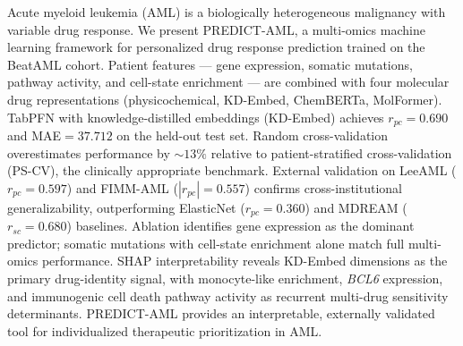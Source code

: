\documentclass[pdflatex,sn-mathphys-num]{sn-jnl}
\theoremstyle{thmstyleone}
\theoremstyle{thmstyletwo}
\theoremstyle{thmstylethree}
\begin{document}
{%
Acute myeloid leukemia (AML) is a biologically heterogeneous malignancy with variable drug response. We present PREDICT-AML, a multi-omics machine learning framework for personalized drug response prediction trained on the BeatAML cohort. Patient features — gene expression, somatic mutations, pathway activity, and cell-state enrichment — are combined with four molecular drug representations (physicochemical, KD-Embed, ChemBERTa, MolFormer). TabPFN with knowledge-distilled embeddings (KD-Embed) achieves $r_{pc}=0.690$ and MAE$=37.712$ on the held-out test set. Random cross-validation overestimates performance by $\sim\!13\%$ relative to patient-stratified cross-validation (PS-CV), the clinically appropriate benchmark. External validation on LeeAML ($r_{pc}=0.597$) and FIMM-AML ($|r_{pc}|=0.557$) confirms cross-institutional generalizability, outperforming ElasticNet ($r_{pc}=0.360$) and MDREAM ($r_{sc}=0.680$) baselines. Ablation identifies gene expression as the dominant predictor; somatic mutations with cell-state enrichment alone match full multi-omics performance. SHAP interpretability reveals KD-Embed dimensions as the primary drug-identity signal, with monocyte-like enrichment, \textit{BCL6} expression, and immunogenic cell death pathway activity as recurrent multi-drug sensitivity determinants. PREDICT-AML provides an interpretable, externally validated tool for individualized therapeutic prioritization in AML.
}
\end{document}
